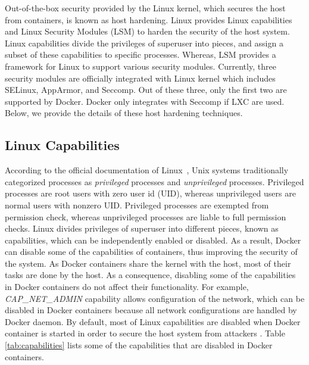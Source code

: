 Out-of-the-box security provided by the Linux kernel, which secures the
host from containers, is known as host hardening.
Linux provides Linux capabilities and Linux Security Modules (LSM)
to harden the security of the host system. Linux capabilities divide
the privileges of superuser into pieces, and assign a subset of these
capabilities to specific processes. Whereas, LSM provides a framework
for Linux to support various security modules. Currently, three security
modules are officially integrated with Linux kernel which includes SELinux,
AppArmor, and Seccomp. Out of these three, only the first two are
supported by Docker. Docker only integrates with Seccomp if LXC are used.
Below, we provide the details of these host hardening techniques.

\subsection{Linux Capabilities}

According to the official documentation of Linux~\cite{man7},
Unix systems traditionally categorized processes as \textit{privileged} processes and
\textit{unprivileged} processes. Privileged processes are root users with
zero user id (UID), whereas unprivileged users are normal users with nonzero
UID. Privileged processes are exempted from permission check, whereas
unprivileged processes are liable to full permission checks.
Linux divides privileges of superuser into different pieces, known as
capabilities, which can be independently enabled or disabled.
As a result, Docker can disable some of the capabilities of containers,
thus improving the security of the system. As Docker containers share the
kernel with the host, most of their tasks are done by the host. As a
consequence, disabling some of the capabilities in Docker containers do
not affect their functionality. For example, \textit{CAP\_NET\_ADMIN}
capability allows configuration of the network, which can be disabled in
Docker containers because all network configurations are handled by
Docker daemon. By default, most of Linux capabilities are disabled
when Docker container is started in order to secure the host system
from attackers \cite{walsh2}. Table \ref{tab:capabilities} lists some of the
capabilities that are disabled in Docker containers.

